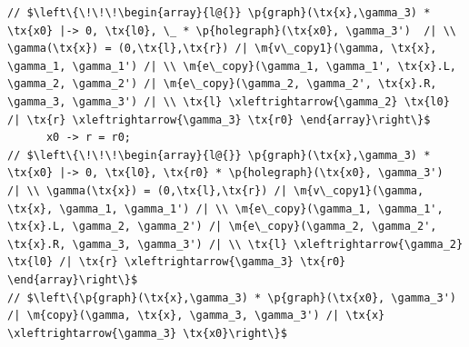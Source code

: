 \documentclass[acmsmall,screen]{acmart}  %
\newcommand{\tx}[1]{\text{#1}}
\newcommand{\p}[1]{\ensuremath{\mathsf{#1}}} \newcommand{\m}[1]{\ensuremath{\mathit{#1}}} \newcommand{\ma}[1]{\ensuremath{\mathcal{#1}}} \let\ramify\lightning
\begin{document}
\begin{lstlisting}
// $\left\{\!\!\!\begin{array}{l@{}} \p{graph}(\tx{x},\gamma_3) * \tx{x0} |-> 0, \tx{l0}, \_ * \p{holegraph}(\tx{x0}, \gamma_3')  /| \\ \gamma(\tx{x}) = (0,\tx{l},\tx{r}) /| \m{v\_copy1}(\gamma, \tx{x}, \gamma_1, \gamma_1') /| \\ \m{e\_copy}(\gamma_1, \gamma_1', \tx{x}.L, \gamma_2, \gamma_2') /| \m{e\_copy}(\gamma_2, \gamma_2', \tx{x}.R, \gamma_3, \gamma_3') /| \\ \tx{l} \xleftrightarrow{\gamma_2} \tx{l0} /| \tx{r} \xleftrightarrow{\gamma_3} \tx{r0} \end{array}\right\}$
      x0 -> r = r0;
// $\left\{\!\!\!\begin{array}{l@{}} \p{graph}(\tx{x},\gamma_3) * \tx{x0} |-> 0, \tx{l0}, \tx{r0} * \p{holegraph}(\tx{x0}, \gamma_3')  /| \\ \gamma(\tx{x}) = (0,\tx{l},\tx{r}) /| \m{v\_copy1}(\gamma, \tx{x}, \gamma_1, \gamma_1') /| \\ \m{e\_copy}(\gamma_1, \gamma_1', \tx{x}.L, \gamma_2, \gamma_2') /| \m{e\_copy}(\gamma_2, \gamma_2', \tx{x}.R, \gamma_3, \gamma_3') /| \\ \tx{l} \xleftrightarrow{\gamma_2} \tx{l0} /| \tx{r} \xleftrightarrow{\gamma_3} \tx{r0} \end{array}\right\}$
// $\left\{\p{graph}(\tx{x},\gamma_3) * \p{graph}(\tx{x0}, \gamma_3') /| \m{copy}(\gamma, \tx{x}, \gamma_3, \gamma_3') /| \tx{x} \xleftrightarrow{\gamma_3} \tx{x0}\right\}$
  \end{lstlisting}
\end{document}
